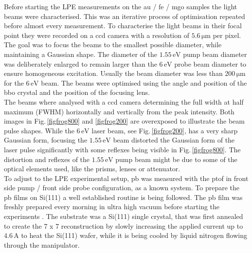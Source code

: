 \documentclass[a4paper,12pt,twoside]{article}
\begin{document}
Before starting the \gls{LPE} measurements on the \gls{au} / \gls{fe} / \gls{mgo} samples the light beams were characterised. This was an iterative process of optimisation repeated before almost every measurement. To characterise the light beams in their focal point they were recorded on a \gls{ccd} camera with a resolution of $5.6\,\mathrm{\mu m}$ per pixel. The goal was to focus the beams to the smallest possible diameter, while maintaining a Gaussian shape. The diameter of the $1.55\,\mathrm{eV}$ pump beam diameter was deliberately enlarged to remain larger than the $6\,\mathrm{eV}$ probe beam diameter to ensure homogeneous excitation. Usually the beam diameter was less than $200\,\mathrm{\mu m}$ for the $6\,\mathrm{eV}$ beam. The beams were optimised using the angle and position of the \gls{bbo} crystal and the position of the focusing lens.\\
The beams where analysed with a \gls{ccd} camera determining the full width at half maximum (FWHM) horizontally and vertically from the peak intensity. Both images in Fig.\,\ref{figfrog800} and \ref{figfrog200} are overexposed to illustrate the beam pulse shapes. While the $6\,\mathrm{eV}$ laser beam, see Fig.\,\ref{figfrog200}, has a very sharp Gaussian form, focusing the $1.55\,\mathrm{eV}$ beam distorted the Gaussian form of the laser pulse significantly with some reflexes being visible in Fig.\,\ref{figfrog800}. The distortion and reflexes of the $1.55\,\mathrm{eV}$ pump beam might be due to some of the optical elements used, like the prisms, lenses or attenuator.
\\
To adjust to the \gls{LPE} experimental setup, \gls{pb} was measured with the \gls{ptof} in front side pump / front side probe configuration, as a known system. To prepare the \gls{pb} films on Si(111) a well established routine is being followed. The \gls{pb} film was freshly prepared every morning in ultra high vacuum before starting the experiments \cite{Sandhofer2014}. The substrate was a Si(111) single crystal, that was first annealed to create the 7 x 7 reconstruction by slowly increasing the applied current up to $4.6\,\mathrm{A}$ to heat the Si(111) wafer, while it is being cooled by liquid nitrogen flowing through the manipulator. 
\end{document}
